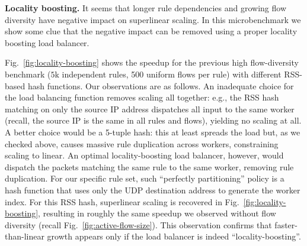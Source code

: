 \noindent%
\textbf{Locality boosting.} %
It seems that longer rule dependencies and growing flow diversity have negative impact on superlinear scaling. In this microbenchmark we show some clue that the negative impact can be removed using a proper locality boosting load balancer.

Fig.~\ref{fig:locality-boosting} shows the speedup for the previous high flow-diversity benchmark ($5$k independent rules, 500 uniform flows per rule) with different RSS-based hash functions. Our observations are as follows. An inadequate choice for the load balancing function removes scaling all together: e.g., the RSS hash matching on only the source IP address dispatches all input to the same worker (recall, the source IP is the same in all rules and flows), yielding no scaling at all. A better choice would be a 5-tuple hash: this at least spreads the load but, as we checked above, causes massive rule duplication across workers, constraining scaling to linear.  An optimal locality-boosting load balancer, however, would dispatch the packets matching the same rule to the same worker, removing rule duplication. For our specific rule set, such ``perfectly partitioning'' policy is a hash function that uses only the UDP destination address to generate the worker index. For this RSS hash, superlinear scaling is recovered in Fig.~\ref{fig:locality-boosting}, resulting in roughly the same speedup we observed without flow diversity (recall Fig.~\ref{fig:active-flow-size}).  This observation confirms that faster-than-linear growth appears only if the load balancer is indeed ``locality-boosting''. %

